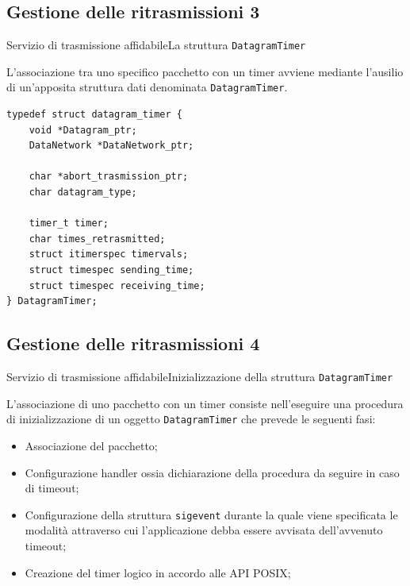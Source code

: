 \documentclass[10pt]{beamer}
\begin{document}
\subsection{Gestione delle ritrasmissioni 3}
\begin{frame}[fragile]{Servizio di trasmissione affidabile}{La struttura \texttt{DatagramTimer}}

L'associazione tra uno specifico pacchetto con un timer avviene mediante l'ausilio di un'apposita struttura dati denominata \texttt{DatagramTimer}.

\begin{lstlisting}[frame=lines, caption={Implementazione della struttura \texttt{DatagramTimer}}]
typedef struct datagram_timer {
	void *Datagram_ptr;
	DataNetwork *DataNetwork_ptr;
	
	char *abort_trasmission_ptr;
	char datagram_type;
	
	timer_t timer;
	char times_retrasmitted;
	struct itimerspec timervals;
	struct timespec sending_time;
	struct timespec receiving_time;
} DatagramTimer;
\end{lstlisting}


\end{frame}

\subsection{Gestione delle ritrasmissioni 4}
\begin{frame}[fragile]{Servizio di trasmissione affidabile}{Inizializzazione della struttura \texttt{DatagramTimer}}

L'associazione di uno pacchetto con un timer consiste nell'eseguire una procedura di inizializzazione di un oggetto \texttt{DatagramTimer} che prevede le seguenti fasi:

\begin{itemize}
\item Associazione del pacchetto;
\item Configurazione handler ossia dichiarazione della procedura da seguire in caso di timeout;
\item Configurazione della struttura \texttt{sigevent} durante la quale viene specificata le modalità attraverso cui l'applicazione debba essere avvisata dell'avvenuto timeout;
\item Creazione del timer logico in accordo alle API POSIX;
\end{itemize}

\end{frame}
\end{document}
